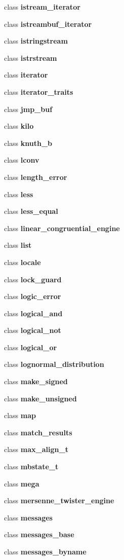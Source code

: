 \begin{DoxyCompactItemize}
\item 
class \textbf{ istream\+\_\+iterator}
\item 
class \textbf{ istreambuf\+\_\+iterator}
\item 
class \textbf{ istringstream}
\item 
class \textbf{ istrstream}
\item 
class \textbf{ iterator}
\item 
class \textbf{ iterator\+\_\+traits}
\item 
class \textbf{ jmp\+\_\+buf}
\item 
class \textbf{ kilo}
\item 
class \textbf{ knuth\+\_\+b}
\item 
class \textbf{ lconv}
\item 
class \textbf{ length\+\_\+error}
\item 
class \textbf{ less}
\item 
class \textbf{ less\+\_\+equal}
\item 
class \textbf{ linear\+\_\+congruential\+\_\+engine}
\item 
class \textbf{ list}
\item 
class \textbf{ locale}
\item 
class \textbf{ lock\+\_\+guard}
\item 
class \textbf{ logic\+\_\+error}
\item 
class \textbf{ logical\+\_\+and}
\item 
class \textbf{ logical\+\_\+not}
\item 
class \textbf{ logical\+\_\+or}
\item 
class \textbf{ lognormal\+\_\+distribution}
\item 
class \textbf{ make\+\_\+signed}
\item 
class \textbf{ make\+\_\+unsigned}
\item 
class \textbf{ map}
\item 
class \textbf{ match\+\_\+results}
\item 
class \textbf{ max\+\_\+align\+\_\+t}
\item 
class \textbf{ mbstate\+\_\+t}
\item 
class \textbf{ mega}
\item 
class \textbf{ mersenne\+\_\+twister\+\_\+engine}
\item 
class \textbf{ messages}
\item 
class \textbf{ messages\+\_\+base}
\item 
class \textbf{ messages\+\_\+byname}

\end{DoxyCompactItemize}
